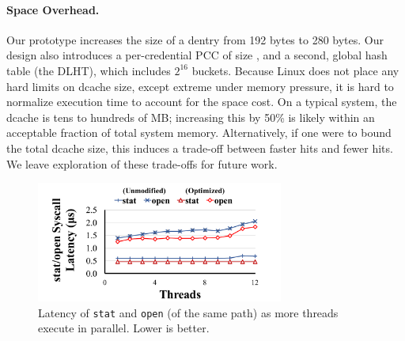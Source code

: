 \begin{table}[t]
\end{table}




\paragraph{Space Overhead.}
Our prototype increases the size of a dentry from 192 bytes to 280 bytes.
Our design also introduces a per-credential PCC of size \PCCsize{}, 
and a second, global hash table (the DLHT),
which includes $2^{16}$ buckets.
Because Linux does not place any hard limits on dcache size, except extreme under memory pressure, 
it is hard to normalize execution time to account for the space cost.
On a typical system, the dcache is tens to hundreds of MB; increasing this by 50\% is likely within an acceptable 
fraction of total system memory.
Alternatively, if one were to bound the total dcache size, this induces
a trade-off between faster hits and fewer hits.  
We leave exploration of these trade-offs for future work.


\begin{figure}[t!]
\scriptsize
\centering
\includegraphics[width=3.2in]{dcache/plots/stat-open-scal.pdf}
\vspace{-5pt}
\caption[The optimized {\tt stat} and {\tt open} latency when called in parallel.]
{Latency of {\tt stat} and {\tt open} (of the same path) as more threads execute in parallel.  Lower is better.}
\label{fig:dcache:scalability}
\end{figure}



